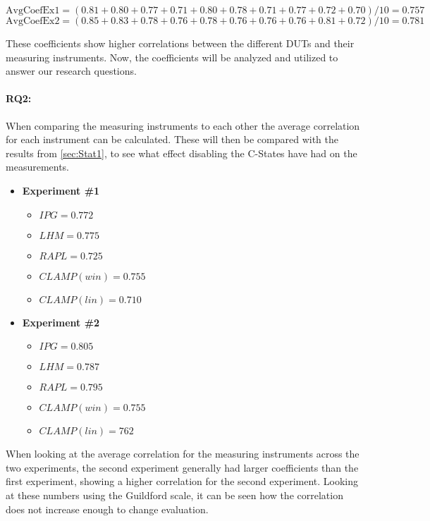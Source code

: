 $$\text{AvgCoefEx1} = (0.81+0.80+0.77+0.71+0.80+0.78+0.71+0.77+0.72+0.70)/10 = 0.757$$
$$\text{AvgCoefEx2} = (0.85+0.83+0.78+0.76+0.78+0.76+0.76+0.76+0.81+0.72)/10 = 0.781$$

These coefficients show higher correlations between the different DUTs and their measuring instruments. Now, the coefficients will be analyzed and utilized to answer our research questions. 

\paragraph{RQ2:} When comparing the measuring instruments to each other the average correlation for each instrument can be calculated. These will then be compared with the results from \cref{sec:Stat1}, to see what effect disabling the C-States have had on the measurements.

\begin{itemize}
    \item \textbf{Experiment \#1}
    \begin{itemize}
        \item $IPG = 0.772$ %
        \item $LHM = 0.775$ %
        \item $RAPL = 0.725$ %
        \item $CLAMP(win) = 0.755$ %
        \item $CLAMP(lin) = 0.710$ %
    \end{itemize}
    \item \textbf{Experiment \#2}
    \begin{itemize}
        \item $IPG = 0.805$ %
        \item $LHM = 0.787$ %
        \item $RAPL = 0.795$%
        \item $CLAMP(win) = 0.755$ %
        \item $CLAMP(lin) = 762$ %
    \end{itemize}
\end{itemize}

When looking at the average correlation for the measuring instruments across the two experiments, the second experiment generally had larger coefficients than the first experiment, showing a higher correlation for the second experiment. Looking at these numbers using the Guildford scale, it can be seen how the correlation does not increase enough to change evaluation.

